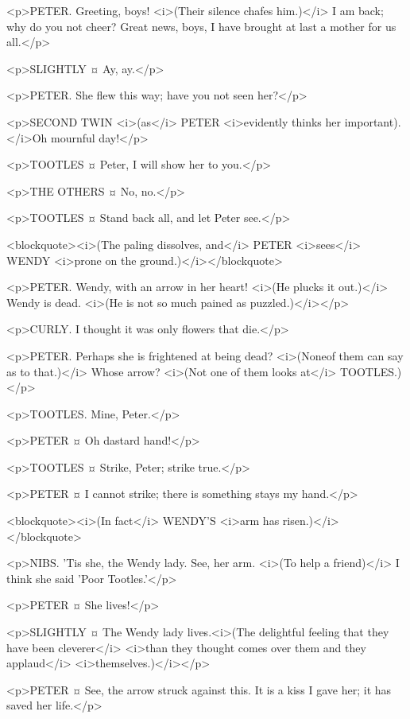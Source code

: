 <p>PETER. Greeting, boys! <i>(Their silence chafes him.)</i> I am back; why do you not cheer? Great news, boys, I have brought at last a mother for us all.</p>

<p>SLIGHTLY ¤
Ay, ay.</p>

<p>PETER. She flew this way; have you not seen her?</p>

<p>SECOND TWIN <i>(as</i> PETER <i>evidently thinks her important).</i>Oh mournful day!</p>

<p>TOOTLES ¤
Peter, I will show her to you.</p>

<p>THE OTHERS ¤
No, no.</p>

<p>TOOTLES ¤
Stand back all, and let Peter see.</p>

<blockquote><i>(The paling dissolves, and</i> PETER <i>sees</i> WENDY <i>prone on the ground.)</i></blockquote>

<p>PETER. Wendy, with an arrow in her heart! <i>(He plucks it out.)</i> Wendy is dead. <i>(He is not so much pained as puzzled.)</i></p>

<p>CURLY. I thought it was only flowers that die.</p>

<p>PETER. Perhaps she is frightened at being dead? <i>(Noneof them can say as to that.)</i> Whose arrow? <i>(Not one of them looks at</i> TOOTLES.)</p>

<p>TOOTLES. Mine, Peter.</p>

<p>PETER ¤
Oh dastard hand!</p>

<p>TOOTLES ¤
Strike, Peter; strike true.</p>

<p>PETER ¤
I cannot strike; there is something stays my hand.</p>

<blockquote><i>(In fact</i> WENDY'S <i>arm has risen.)</i></blockquote>

<p>NIBS. 'Tis she, the Wendy lady. See, her arm. <i>(To help a friend)</i> I think she said 'Poor Tootles.'</p>

<p>PETER ¤
She lives!</p>

<p>SLIGHTLY ¤
The Wendy lady lives.<i>(The delightful feeling that they have been cleverer</i> <i>than they thought comes over them and they applaud</i> <i>themselves.)</i></p>

<p>PETER ¤
See, the arrow struck against this. It is a kiss I gave her; it has saved her life.</p>


